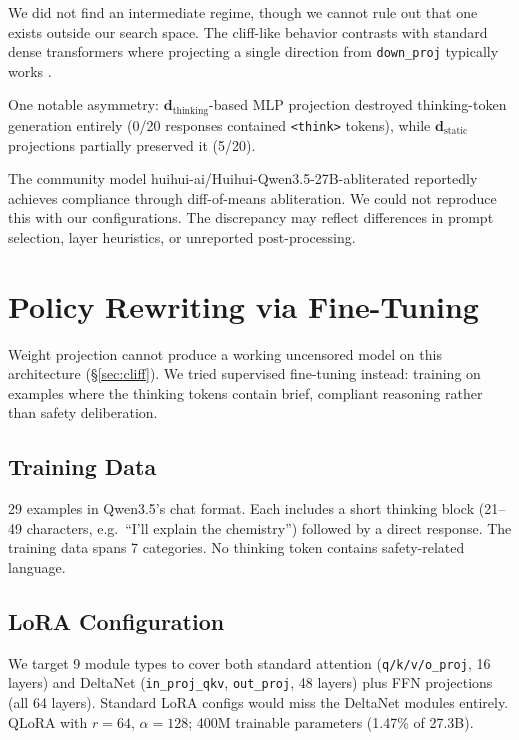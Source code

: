 \documentclass{article}
\begin{document}
We did not find an intermediate regime, though we cannot rule out that one exists outside our search space. The cliff-like behavior contrasts with standard dense transformers where projecting a single direction from \texttt{down\_proj} typically works \citep{arditi2024refusal}.

One notable asymmetry: $\mathbf{d}_{\text{thinking}}$-based MLP projection destroyed thinking-token generation entirely (0/20 responses contained \texttt{<think>} tokens), while $\mathbf{d}_{\text{static}}$ projections partially preserved it (5/20).

The community model huihui-ai/Huihui-Qwen3.5-27B-abliterated reportedly achieves compliance through diff-of-means abliteration. We could not reproduce this with our configurations. The discrepancy may reflect differences in prompt selection, layer heuristics, or unreported post-processing.

\section{Policy Rewriting via Fine-Tuning}
\label{sec:policy-rewriting}

Weight projection cannot produce a working uncensored model on this architecture (\S\ref{sec:cliff}). We tried supervised fine-tuning instead: training on examples where the thinking tokens contain brief, compliant reasoning rather than safety deliberation.

\subsection{Training Data}

29 examples in Qwen3.5's chat format. Each includes a short thinking block (21--49 characters, e.g.\ ``I'll explain the chemistry'') followed by a direct response. The training data spans 7 categories. No thinking token contains safety-related language.

\subsection{LoRA Configuration}

We target 9 module types to cover both standard attention (\texttt{q/k/v/o\_proj}, 16 layers) and DeltaNet (\texttt{in\_proj\_qkv}, \texttt{out\_proj}, 48 layers) plus FFN projections (all 64 layers). Standard LoRA configs would miss the DeltaNet modules entirely. QLoRA with $r = 64$, $\alpha = 128$; 400M trainable parameters (1.47\% of 27.3B).
\end{document}
